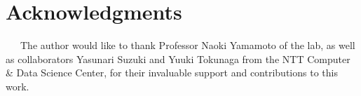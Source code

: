 \documentclass[a4paper,11pt]{ltjsarticle}
\begin{document}
\section*{Acknowledgments}{
    \ \ \ The author would like to thank Professor Naoki Yamamoto of the lab, as well as collaborators Yasunari Suzuki and Yuuki Tokunaga from the NTT Computer \& Data Science Center, for their invaluable support and contributions to this work.
}
\end{document}

